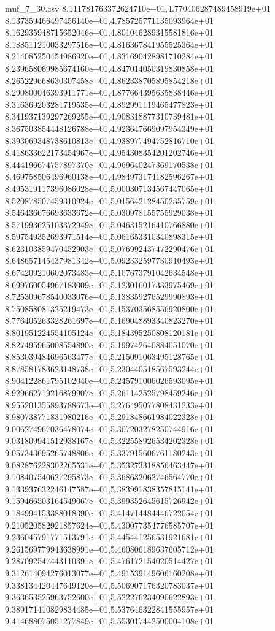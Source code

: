 \begin{filecontents*}{muf_7_30.csv}
8.111781763372624710e+01,4.770406287489458919e+01
8.137359466497456140e+01,4.785725771135093964e+01
8.162935948715652046e+01,4.801046289315581816e+01
8.188511210033297516e+01,4.816367841955525364e+01
8.214085250454986920e+01,4.831690428981710284e+01
8.239658069985674160e+01,4.847014050319830858e+01
8.265229668630307458e+01,4.862338705895854218e+01
8.290800046393911771e+01,4.877664395635838446e+01
8.316369203281719535e+01,4.892991119465477823e+01
8.341937139297269255e+01,4.908318877310739481e+01
8.367503854448126788e+01,4.923647669097954349e+01
8.393069348738610813e+01,4.938977494752816710e+01
8.418633622173454967e+01,4.954308354201202746e+01
8.444196674757897370e+01,4.969640247369170538e+01
8.469758506496960138e+01,4.984973174182596267e+01
8.495319117396086028e+01,5.000307134567447065e+01
8.520878507459310924e+01,5.015642128450235759e+01
8.546436676693633672e+01,5.030978155755929038e+01
8.571993625103372949e+01,5.046315216410766880e+01
8.597549352693971514e+01,5.061653310340898315e+01
8.623103859470452903e+01,5.076992437472290476e+01
8.648657145437981342e+01,5.092332597730910493e+01
8.674209210602073483e+01,5.107673791042634548e+01
8.699760054967183009e+01,5.123016017333975469e+01
8.725309678540033076e+01,5.138359276529990893e+01
8.750858081325219473e+01,5.153703568556920800e+01
8.776405263328261697e+01,5.169048893340823270e+01
8.801951224554105124e+01,5.184395250808120181e+01
8.827495965008554890e+01,5.199742640884051070e+01
8.853039484696563477e+01,5.215091063495128765e+01
8.878581783623148738e+01,5.230440518567593244e+01
8.904122861795102040e+01,5.245791006026593095e+01
8.929662719216879907e+01,5.261142525798459246e+01
8.955201355893788673e+01,5.276495077808431233e+01
8.980738771831980216e+01,5.291848661984022328e+01
9.006274967036478074e+01,5.307203278250744916e+01
9.031809941512938167e+01,5.322558926534202328e+01
9.057343695265748806e+01,5.337915606761180243e+01
9.082876228302265531e+01,5.353273318856463447e+01
9.108407540627295873e+01,5.368632062746564770e+01
9.133937632246147587e+01,5.383991838357815141e+01
9.159466503164549067e+01,5.399352645615726942e+01
9.184994153388018390e+01,5.414714484446722054e+01
9.210520582921857624e+01,5.430077354776585707e+01
9.236045791771513791e+01,5.445441256531921681e+01
9.261569779943638991e+01,5.460806189637605712e+01
9.287092547443110391e+01,5.476172154020514427e+01
9.312614094276013077e+01,5.491539149606160208e+01
9.338134420447649120e+01,5.506907176320783037e+01
9.363653525963752600e+01,5.522276234090622893e+01
9.389171410829834485e+01,5.537646322841555957e+01
9.414688075051277849e+01,5.553017442500004108e+01

\end{filecontents*}
